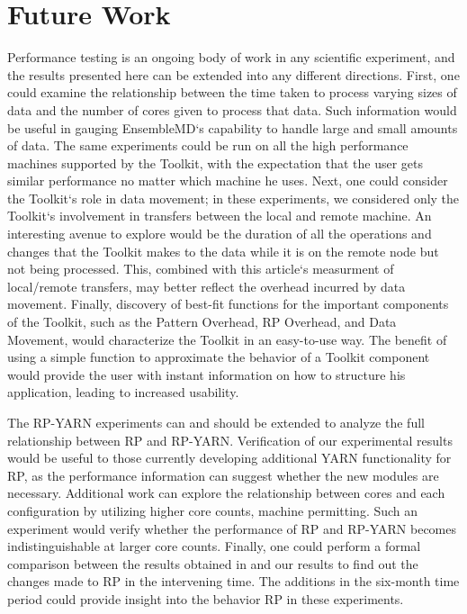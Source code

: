 \documentclass[]{article}
\begin{document}
\section{Future Work}
	Performance testing is an ongoing body of work in any scientific experiment, and the results presented here can be extended into any different directions. First, one could examine the relationship between the time taken to process varying sizes of data and the number of cores given to process that data. Such information would be useful in gauging EnsembleMD`s capability to handle large and small amounts of data. The same experiments could be run on all the high performance machines supported by the Toolkit, with the expectation that the user gets similar performance no matter which machine he uses. Next, one could consider the Toolkit`s role in data movement; in these experiments, we considered only the Toolkit`s involvement in transfers between the local and remote machine. An interesting avenue to explore would be the duration of all the operations and changes that the Toolkit makes to the data while it is on the remote node but not being processed. This, combined with this article`s measurment of local/remote transfers, may better reflect the overhead incurred by data movement. Finally, discovery of best-fit functions for the important components of the Toolkit, such as the Pattern Overhead, RP Overhead, and Data Movement, would characterize the Toolkit in an easy-to-use way. The benefit of using a simple function to approximate the behavior of a Toolkit component would provide the user with instant information on how to structure his application, leading to increased usability.

	The RP-YARN experiments can and should be extended to analyze the full relationship between RP and RP-YARN. Verification of our experimental results would be useful to those currently developing additional YARN functionality for RP, as the performance information can suggest whether the new modules are necessary. Additional work can explore the relationship between cores and each configuration by utilizing higher core counts, machine permitting. Such an experiment would verify whether the performance of RP and RP-YARN becomes indistinguishable at larger core counts. Finally, one could perform a formal comparison between the results obtained in \cite{hadoop_paper} and our results to find out the changes made to RP in the intervening time. The additions in the six-month time period could provide insight into the behavior RP in these experiments.
\end{document}
